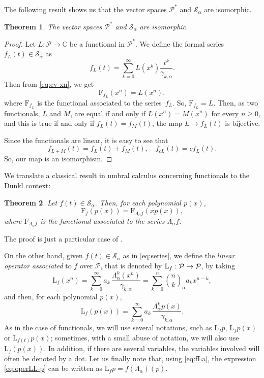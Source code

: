 \documentclass[11pt]{article}
\theoremstyle{plain}
\newtheorem{theorem}{Theorem}[section]
\theoremstyle{remark}
\numberwithin{equation}{section} %
\newcommand{\La}{\Lambda_{\alpha}}
\newcommand{\binoma}[2]{\binom{#1}{#2}_{\!\alpha}}
\newcommand{\calP}{\mathcal{P}}
\newcommand{\Sa}{\mathcal{S}_{\alpha}}
\newcommand{\CC}{\mathbb{C}}
\newcommand{\FF}{\mathrm{F}}
\newcommand{\LL}{\mathrm{L}}
\begin{document}
The following result shows us that the vector spaces $\calP^*$ and $\Sa$ are isomorphic. 

\begin{theorem}
\label{thm:isom}
The vector spaces $\calP^*$ and $\Sa$ are isomorphic.
\end{theorem}

\begin{proof}
Let $L : \calP \to \CC$ be a functional in $\calP^*$. We define the formal series $f_L(t) \in \Sa$ as  
\[
f_L(t) = \sum_{k=0}^{\infty} L(x^k) \frac{t^k}{\gamma_{k,\alpha}}.
\]
Then from \eqref{eq:ev-xn}, we get
\[
\FF_{f_L}(x^n) = L(x^n),
\]
where $\FF_{f_L}$ is the functional associated to the series~$f_L$. So, $\FF_{f_L} = L$. Then, as two functionals, $L$ and $M$, are equal if and only if $L(x^n) = M(x^n)$ for every $n\ge 0$, and this is true if and only if $f_L(t) = f_M(t)$, the map $L \mapsto f_L(t)$ is bijective.

Since the functionals are linear, it is easy to see that
\[
f_{L+M}(t) = f_L(t)+f_M(t),\quad f_{cL}(t) = cf_L(t).
\]
So, our map is an isomorphism. 
\end{proof}

We translate a classical result in umbral calculus concerning functionals to the Dunkl context:

\begin{theorem}
\label{thm:umbral}
Let $f(t) \in \Sa$. Then, for each polynomial $p(x)$,
\begin{equation*}
\FF_{f}(p(x)) = \FF_{\La f}(x p(x)),
\end{equation*}
where $\FF_{\La f}$ is the functional associated to the series $\La f$.
\end{theorem}



The proof is just a particular case of \cite[Theorem~6.2.1]{RomRot}.

On the other hand, given $f(t) \in \Sa$ as in \eqref{eq:series}, we define the \textit{linear operator associated} to $f$ over $\calP$, that is denoted by $\LL_f: \calP \to \cal P$, by taking
\begin{equation*}
\LL_f(x^n) = \sum_{k=0}^{\infty} {a_k} \, \frac{\La^k(x^n)}{\gamma_{k,\alpha}} 
= \sum_{k=0}^n  \binoma{n}{k} a_k x^{n-k},
\end{equation*}
and then, for each polynomial $p(x)$,
\begin{equation}
\label{eq:operLL-p}
\LL_f(p(x)) = \sum_{k=0}^{\infty} {a_k} \, \frac{\La^k p(x)}{\gamma_{k,\alpha}}.
\end{equation}
As in the case of functionals, we will use several notations, such as $\LL_fp$, $\LL_fp(x)$ or $\LL_{f(t)}p(x)$; sometimes, with a small abuse of notation, we will also use $\LL_f(p(x))$. In addition, if there are several variables, the variables involved will often be denoted by a dot. Let us finally note that, using \eqref{eq:fLa}, the expression \eqref{eq:operLL-p} can be written as $\LL_fp = f(\La)(p)$.
\end{document}
